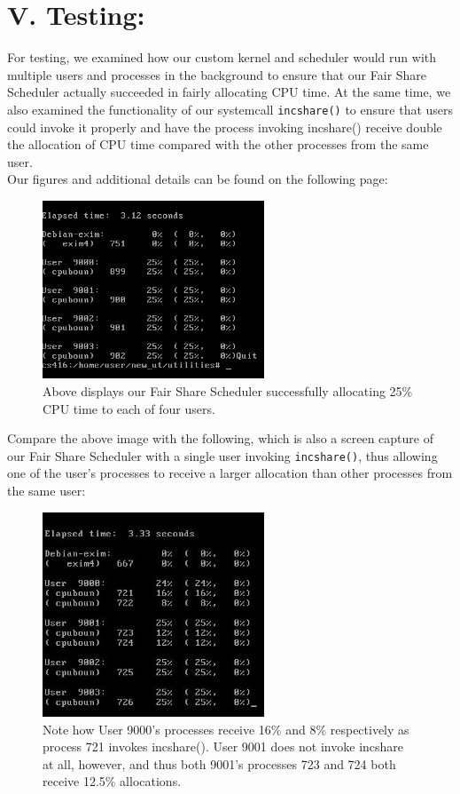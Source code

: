 \documentclass[10pt]{article}
\begin{document}
\section{V. Testing:}

For testing, we examined how our custom kernel and scheduler would run with multiple users and processes in the background to ensure that our Fair Share Scheduler actually succeeded in fairly allocating CPU time. At the same time, we also examined the functionality of our systemcall \texttt{incshare()} to ensure that users could invoke it properly and have the process invoking incshare() receive double the allocation of CPU time compared with the other processes from the same user.  \\

Our figures and additional details can be found on the following page:

\begin{figure}[H]
 \caption{Above displays our Fair Share Scheduler successfully allocating 25\% CPU time to each of four users.}
 \centering
 \includegraphics[width=250px]{fairshare.jpg}
\end{figure}

Compare the above image with the following, which is also a screen capture of our Fair Share Scheduler with a single user invoking \texttt{incshare()}, thus 
allowing one of the user's processes to receive a larger allocation than
other processes from the same user:

\begin{figure}[H]
 \caption{Note how User 9000's processes receive 16\% and 8\% respectively as process 721 invokes incshare(). User 9001 does not invoke incshare at all, however, and thus both 9001's processes 723 and 724 both receive 12.5\% allocations.}
 \centering
 \includegraphics[width=250px]{incsharemonitor.jpg}
\end{figure}
\end{document}
